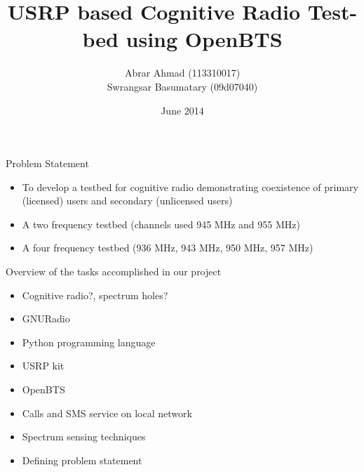 \documentclass{beamer}
\title{USRP based Cognitive Radio Test-bed using OpenBTS}
\author{Abrar Ahmad (113310017) \\ Swrangsar Basumatary (09d07040) }
\institute{Department of Electrical Engineering \\ IIT Bombay, Powai}
\date{June 2014}
\begin{document}
    \frame{\titlepage}


	\begin{frame}{Problem Statement}
    	\begin{itemize}
    		\item To develop a testbed for cognitive radio demonstrating coexistence of primary (licensed) users and secondary (unlicensed users)
    		\item A two frequency testbed (channels used 945 MHz and 955 MHz)
    		\item A four frequency testbed (936 MHz, 943 MHz, 950 MHz, 957 MHz)
    	\end{itemize}
	\end{frame}
	
	\begin{frame}{Overview of the tasks accomplished in our project}
		\begin{itemize}
		\item Cognitive radio?,  spectrum holes?
		\item GNURadio
		\item Python programming language
		\item USRP kit
		\item OpenBTS
		\item Calls and SMS service on local network
		\item Spectrum sensing techniques
		\item Defining problem statement
		\end{itemize}
	\end{frame}
    

    
\end{document}
